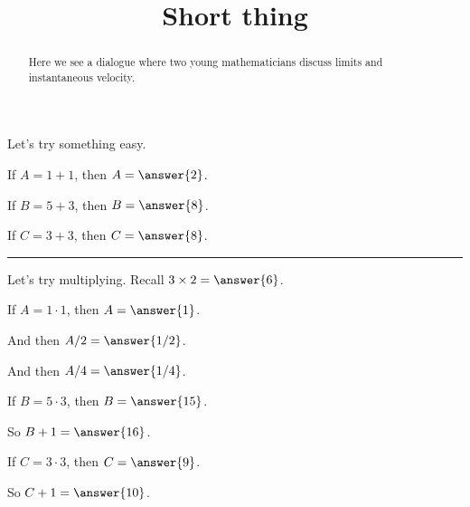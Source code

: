\documentclass{ximera}
\title[Break-Ground:]{Short thing}
\begin{document}
\begin{abstract}
Here we see a dialogue where two young mathematicians discuss limits
and instantaneous velocity.
\end{abstract}

\maketitle

\begin{problem}

Let's try something easy.

\begin{problem}
If $A = 1 + 1$, then $A = \answer{2}$.
\end{problem}

\begin{problem}
If $B = 5 + 3$, then $B = \answer{8}$.
\end{problem}

\begin{problem}
If $C = 3 + 3$, then $C = \answer{8}$.
\end{problem}

\end{problem}

\hrule

\begin{problem}

Let's try multiplying.  Recall $3 \times 2 = \answer{6}$.

\begin{problem}
If $A = 1 \cdot 1$, then $A = \answer{1}$.

\begin{problem}
And then $A/2 = \answer{1/2}$.

\begin{problem}
And then $A/4 = \answer{1/4}$.
\end{problem}
\end{problem}
\end{problem}

\begin{problem}
If $B = 5 \cdot 3$, then $B = \answer{15}$.

\begin{problem}
So $B + 1 = \answer{16}$.
\end{problem}
\end{problem}

\begin{problem}
If $C = 3 \cdot 3$, then $C = \answer{9}$.

\begin{problem}
So $C + 1 = \answer{10}$.
\end{problem}
\end{problem}

\end{problem}
\end{document}
